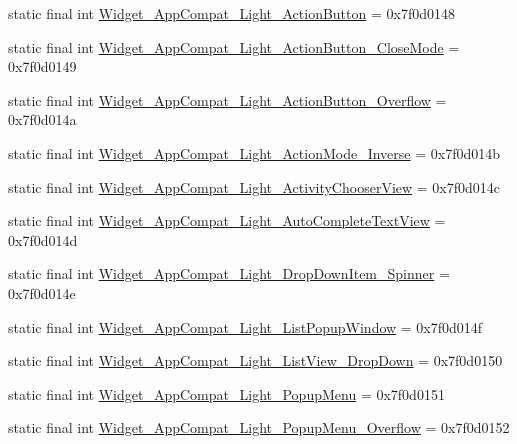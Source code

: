 \begin{DoxyCompactItemize}
\item 
static final int \mbox{\hyperlink{classandroid_1_1support_1_1design_1_1_r_1_1style_acd9731de4a76e4f4d04e4f015f364dbd}{Widget\+\_\+\+App\+Compat\+\_\+\+Light\+\_\+\+Action\+Button}} = 0x7f0d0148
\item 
static final int \mbox{\hyperlink{classandroid_1_1support_1_1design_1_1_r_1_1style_a350ce12c6ed18a70a865f563d8e4c8bb}{Widget\+\_\+\+App\+Compat\+\_\+\+Light\+\_\+\+Action\+Button\+\_\+\+Close\+Mode}} = 0x7f0d0149
\item 
static final int \mbox{\hyperlink{classandroid_1_1support_1_1design_1_1_r_1_1style_a3af81c29dece82cd8a9c1200d4287c5b}{Widget\+\_\+\+App\+Compat\+\_\+\+Light\+\_\+\+Action\+Button\+\_\+\+Overflow}} = 0x7f0d014a
\item 
static final int \mbox{\hyperlink{classandroid_1_1support_1_1design_1_1_r_1_1style_a6e1722fbff8cb1145ad90f0ee788cf4e}{Widget\+\_\+\+App\+Compat\+\_\+\+Light\+\_\+\+Action\+Mode\+\_\+\+Inverse}} = 0x7f0d014b
\item 
static final int \mbox{\hyperlink{classandroid_1_1support_1_1design_1_1_r_1_1style_af07a14791a23f65ae9b307e705db296d}{Widget\+\_\+\+App\+Compat\+\_\+\+Light\+\_\+\+Activity\+Chooser\+View}} = 0x7f0d014c
\item 
static final int \mbox{\hyperlink{classandroid_1_1support_1_1design_1_1_r_1_1style_ac380b3f53f40de9211056c64b6f66307}{Widget\+\_\+\+App\+Compat\+\_\+\+Light\+\_\+\+Auto\+Complete\+Text\+View}} = 0x7f0d014d
\item 
static final int \mbox{\hyperlink{classandroid_1_1support_1_1design_1_1_r_1_1style_a118bf1b8561a3ae251ed642e8fb9bbeb}{Widget\+\_\+\+App\+Compat\+\_\+\+Light\+\_\+\+Drop\+Down\+Item\+\_\+\+Spinner}} = 0x7f0d014e
\item 
static final int \mbox{\hyperlink{classandroid_1_1support_1_1design_1_1_r_1_1style_a2822c3939a9985a663bd4bbfb42a5b10}{Widget\+\_\+\+App\+Compat\+\_\+\+Light\+\_\+\+List\+Popup\+Window}} = 0x7f0d014f
\item 
static final int \mbox{\hyperlink{classandroid_1_1support_1_1design_1_1_r_1_1style_a94e847b19fdbecbf77bcf9270efd3c07}{Widget\+\_\+\+App\+Compat\+\_\+\+Light\+\_\+\+List\+View\+\_\+\+Drop\+Down}} = 0x7f0d0150
\item 
static final int \mbox{\hyperlink{classandroid_1_1support_1_1design_1_1_r_1_1style_a6de5f5410fa15acb332677f38900251c}{Widget\+\_\+\+App\+Compat\+\_\+\+Light\+\_\+\+Popup\+Menu}} = 0x7f0d0151
\item 
static final int \mbox{\hyperlink{classandroid_1_1support_1_1design_1_1_r_1_1style_ab4760c992c625181f7217741a86bd3f1}{Widget\+\_\+\+App\+Compat\+\_\+\+Light\+\_\+\+Popup\+Menu\+\_\+\+Overflow}} = 0x7f0d0152

\end{DoxyCompactItemize}
